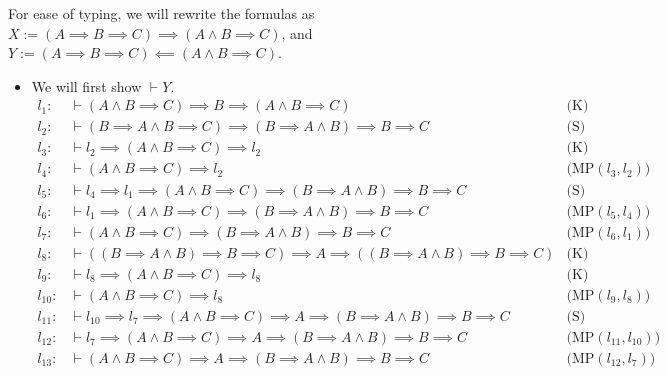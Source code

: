 \begin{itemize}
\begin{itemize}
         For ease of typing, we will rewrite the formulas as $X := (A \implies B \implies C) \implies (A \land B \implies C)$, and $Y := (A \implies B \implies C) \impliedby (A \land B \implies C)$.
         \begin{itemize}
            \item We will first show $\vdash Y$.
            \begin{align*}
                l_1: &\vdash (A \land B \implies C) \implies B \implies (A \land B \implies C)  &\text{(K)} \\
                l_2: &\vdash  (B \implies A \land B \implies C) \implies (B \implies A \land B) \implies B \implies C &\text{(S)} \\
                l_3: &\vdash l_2 \implies (A \land B \implies C) \implies l_2 &\text{(K)} \\
                l_4: &\vdash (A \land B \implies C) \implies l_2 &\text{(MP$(l_3, l_2)$)} \\
                l_5: &\vdash l_4 \implies l_1 \implies (A \land B \implies C) \implies (B \implies A \land B) \implies B \implies C &\text{(S)} \\
                l_6: &\vdash l_1 \implies (A \land B \implies C) \implies (B \implies A \land B) \implies B \implies C  &\text{(MP$(l_5, l_4)$)} \\
                l_7: &\vdash (A \land B \implies C) \implies (B \implies A \land B) \implies B \implies C &\text{(MP$(l_6, l_1)$)} \\
                l_8: &\vdash ((B \implies A \land B) \implies B \implies C) \implies A \implies ((B \implies A \land B) \implies B \implies C) &\text{(K)} \\
                l_9: &\vdash  l_8 \implies (A \land B \implies C) \implies l_8 &\text{(K)} \\
                l_{10}: &\vdash (A \land B \implies C) \implies l_8 &\text{(MP$(l_9, l_8)$)} \\
                l_{11}: &\vdash l_{10} \implies l_7 \implies (A \land B \implies C) \implies A \implies (B \implies A \land B) \implies B \implies C &\text{(S)} \\
                l_{12}: &\vdash l_7 \implies (A \land B \implies C) \implies A \implies (B \implies A \land B) \implies B \implies C  &\text{(MP$(l_{11}, l_{10})$)} \\
                l_{13}: &\vdash (A \land B \implies C) \implies A \implies (B \implies A \land B) \implies B \implies C &\text{(MP$(l_{12}, l_7)$)} \\

\end{align*}
\end{itemize}
\end{itemize}
\end{itemize}
